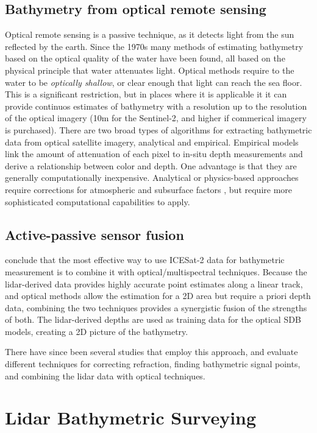 \subsection{Bathymetry from optical remote sensing}
Optical remote sensing is a passive technique, as it detects light from the sun reflected by the earth. Since the 1970s many methods of estimating bathymetry based on the optical quality of the water have been found, all based on the physical principle that water attenuates light. Optical methods require to the water to be \emph{optically shallow}, or clear enough that light can reach the sea floor. This is a significant restriction, but in places where it is applicable it it can provide continuos estimates of bathymetry with a resolution up to the resolution of the optical imagery (10m for the Sentinel-2, and higher if commerical imagery is purchased). There are two broad types of algorithms for extracting bathymetric data from optical satellite imagery, analytical and empirical. Empirical models link the amount of attenuation of each pixel to in-situ depth measurements and derive a relationship between color and depth. One advantage is that they are generally computationally inexpensive. Analytical or physics-based approaches require corrections for atmospheric and subsurface factors \parencite{Turner2021}, but require more sophisticated computational capabilities to apply.


\subsection{Active-passive sensor fusion}
\cite{Parrish2019} conclude that the most effective way to use ICESat-2 data for bathymetric measurement is to combine it with optical/multispectral techniques. Because the lidar-derived data provides highly accurate point estimates along a linear track, and optical methods allow the estimation for a 2D area but require a priori depth data, combining the two techniques provides a synergistic fusion of the strengths of both. The lidar-derived depths are used as training data for the optical SDB models, creating a 2D picture of the bathymetry.

There have since been several studies that employ this approach, and evaluate different techniques for correcting refraction, finding bathymetric signal points, and combining the lidar data with optical techniques.


\section{Lidar Bathymetric Surveying}

